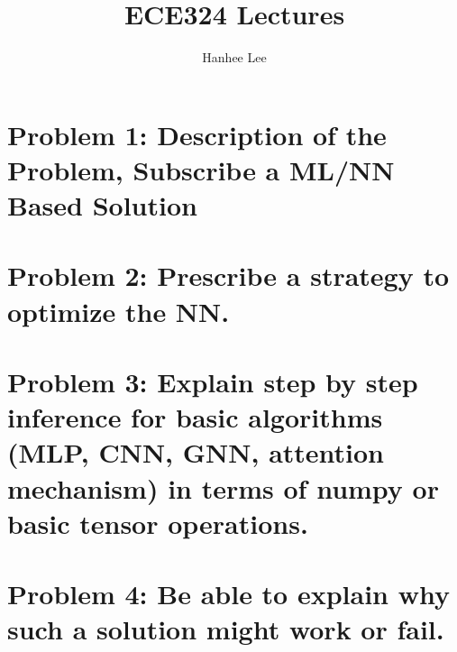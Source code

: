 \documentclass{article}
\title{ECE324 Lectures}
\author{Hanhee Lee}
\begin{document}
\section{Problem 1: Description of the Problem, Subscribe a ML/NN Based Solution}
\begin{process}

\end{process}

\begin{definition}
    
\end{definition}

\begin{example}
    
\end{example}

\section{Problem 2: Prescribe a strategy to optimize the NN.}
\begin{process}

\end{process}

\begin{definition}
    
\end{definition}

\begin{example}
    
\end{example}

\section{Problem 3: Explain step by step inference for basic algorithms (MLP, CNN, GNN, attention mechanism) in terms of numpy or basic tensor operations.}
\begin{process}

\end{process}

\begin{definition}
    
\end{definition}

\begin{example}
    
\end{example}

\section{Problem 4: Be able to explain why such a solution might work or fail.} 
\begin{process}

\end{process}
\end{document}
